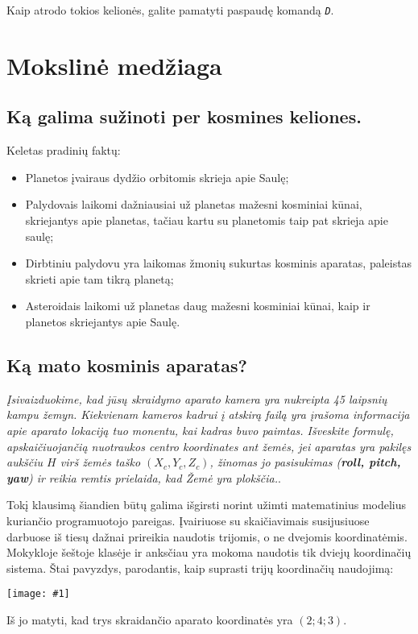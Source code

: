 \documentclass[a4paper]{article}
\newcommand{\incl}[2]{\texttt{[image: \#1]}}
\begin{document}
Kaip atrodo tokios kelionės, galite pamatyti paspaudę komandą \texttt{\textit{D}}.

\section*{Mokslinė medžiaga}
\subsection*{Ką galima sužinoti per kosmines keliones.}
Keletas pradinių faktų:
\begin{itemize}
\item Planetos įvairaus dydžio orbitomis skrieja apie Saulę;
\item Palydovais laikomi dažniausiai už planetas mažesni kosminiai kūnai, skriejantys apie planetas, tačiau kartu su planetomis taip pat skrieja apie saulę;
\item Dirbtiniu palydovu yra laikomas žmonių sukurtas kosminis aparatas, paleistas skrieti apie tam tikrą planetą;
\item Asteroidais laikomi už planetas daug mažesni kosminiai kūnai, kaip ir planetos skriejantys apie Saulę. 
\end{itemize}
\subsection*{Ką mato kosminis aparatas?}

\textit{Įsivaizduokime, kad jūsų skraidymo aparato kamera yra nukreipta 45 laipsnių kampu žemyn. Kiekvienam kameros kadrui į atskirą failą yra įrašoma informacija apie aparato lokaciją tuo monentu, kai kadras buvo paimtas. Išveskite formulę, apskaičiuojančią nuotraukos centro koordinates ant žemės, jei aparatas yra pakilęs aukščiu $H$ virš žemės taško $(X_c, Y_c, Z_c)$,  žinomas jo pasisukimas (\textbf{roll, pitch, yaw}) ir reikia remtis prielaida, kad Žemė yra plokščia.}.

Tokį klausimą šiandien būtų galima išgirsti norint užimti matematinius modelius kuriančio programuotojo pareigas. Įvairiuose su skaičiavimais susijusiuose darbuose iš tiesų dažnai prireikia naudotis trijomis, o ne dvejomis koordinatėmis. Mokykloje šeštoje klasėje ir anksčiau yra mokoma naudotis tik dviejų koordinačių sistema. Štai pavyzdys, parodantis, kaip suprasti trijų koordinačių naudojimą:

\incl{cartesia.png}{0.4} 

Iš jo matyti, kad trys skraidančio aparato koordinatės yra $(2; 4; 3)$. 
\end{document}
